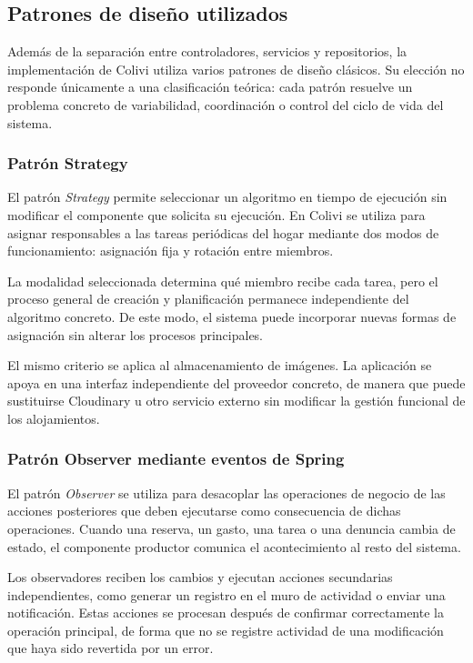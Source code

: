 \subsection{Patrones de diseño utilizados}
\label{subsec:patrones_diseno}

Además de la separación entre controladores, servicios y repositorios, la implementación de Colivi utiliza varios patrones de diseño clásicos. Su elección no responde únicamente a una clasificación teórica: cada patrón resuelve un problema concreto de variabilidad, coordinación o control del ciclo de vida del sistema.

\subsubsection{Patrón Strategy}

El patrón \emph{Strategy} permite seleccionar un algoritmo en tiempo de ejecución sin modificar el componente que solicita su ejecución. En Colivi se utiliza para asignar responsables a las tareas periódicas del hogar mediante dos modos de funcionamiento: asignación fija y rotación entre miembros.

La modalidad seleccionada determina qué miembro recibe cada tarea, pero el proceso general de creación y planificación permanece independiente del algoritmo concreto. De este modo, el sistema puede incorporar nuevas formas de asignación sin alterar los procesos principales.

El mismo criterio se aplica al almacenamiento de imágenes. La aplicación se apoya en una interfaz independiente del proveedor concreto, de manera que puede sustituirse Cloudinary u otro servicio externo sin modificar la gestión funcional de los alojamientos.

\subsubsection{Patrón Observer mediante eventos de Spring}

El patrón \emph{Observer} se utiliza para desacoplar las operaciones de negocio de las acciones posteriores que deben ejecutarse como consecuencia de dichas operaciones. Cuando una reserva, un gasto, una tarea o una denuncia cambia de estado, el componente productor comunica el acontecimiento al resto del sistema.

Los observadores reciben los cambios y ejecutan acciones secundarias independientes, como generar un registro en el muro de actividad o enviar una notificación. Estas acciones se procesan después de confirmar correctamente la operación principal, de forma que no se registre actividad de una modificación que haya sido revertida por un error.

